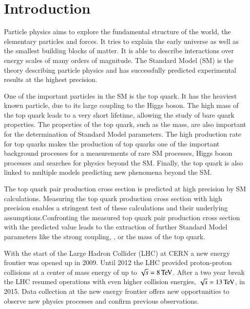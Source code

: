 
\chapter{Introduction}

Particle physics aims to explore the fundamental structure of the world, the elementary particles and forces. It tries to explain the early universe as well as the smallest building blocks of matter. It is able to describe interactions over energy scales of many orders of magnitude. 
The Standard Model (SM) is the theory describing particle physics and has successfully predicted experimental results at the highest precision. 

One of the important particles in the SM is the top quark. It has the heaviest known particle, due to its large coupling to the Higgs boson. 
The high mass of the top quark leads to a very short lifetime, allowing the study of bare quark properties.
The properties of the top quark, such as the mass, are also important for the determination of Standard Model parameters. The high production rate for top quarks makes the production of top quarks 
one of the important background processes for a measurements of rare SM processes, Higgs boson processes and searches for physics beyond the SM. Finally, the top quark is also linked to multiple models predicting new phenomena beyond the SM.

The top quark pair production cross section is predicted at high precision by SM calculations. Measuring the top quark production cross section with high precision enables a stringent test of these calculations and their underlying assumptions.Confronting the measured top quark pair production cross section with the predicted value leads to the extraction of further Standard Model parameters like the strong coupling, \as, or the mass of the top quark.

With the start of the Large Hadron Collider (LHC) at CERN a new energy frontier was opened up in 2009. Until 2012 the LHC provided proton-proton collisions at a center of mass energy of up to $\sqrt{s}=8 \,\text{Te\hspace{-.08em}V}$.  After a two year break the LHC resumed operations with even higher collision energies, $\sqrt{s}=13 \,\text{Te\hspace{-.08em}V}$, in 2015.
Data collection at the new energy frontier offers new opportunities to observe new physics processes and
confirm previous observations.


